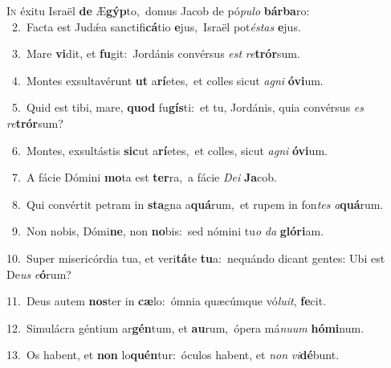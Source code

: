 \lettrine{\initial\textcolor{\initialcolor}{I}}{n} éxitu Israël \textbf{de} Æ\-\textbf{gýp}\-to,~\star domus Jacob de pó\-\textit{pu}\-\textit{lo} \textbf{bár}\-\textbf{ba}ro:\\
{\numbfont\textcolor{\numbcolor}{~2.}}~Facta est Judǽa sanctifi\-\textbf{cá}\-tio \textbf{e}\-jus,~\star Israël pot\-\textit{és}\-\textit{tas} \textbf{e}\-jus.\par
{\numbfont\textcolor{\numbcolor}{~3.}}~Mare \textbf{vi}\-dit, et \textbf{fu}\-git:~\star Jordánis convérsus \textit{est} \textit{re}\-\textbf{trór}sum.\par
{\numbfont\textcolor{\numbcolor}{~4.}}~Montes exsultavérunt \textbf{ut} a\-\textbf{rí}\-etes,~\star et colles sicut \textit{a}\-\textit{gni} \textbf{ó}\-\textbf{vi}um.\par
{\numbfont\textcolor{\numbcolor}{~5.}}~Quid est tibi, mare, \textbf{quod} fu\-\textbf{gís}\-ti:~\star et tu, Jordánis, quia convérsus \textit{es} \textit{re}\-\textbf{trór}sum?\par
{\numbfont\textcolor{\numbcolor}{~6.}}~Montes, exsultástis \textbf{sic}\-ut a\-\textbf{rí}\-etes,~\star et colles, sicut \textit{a}\-\textit{gni} \textbf{ó}\-\textbf{vi}um.\par
{\numbfont\textcolor{\numbcolor}{~7.}}~A fácie Dómini \textbf{mo}\-ta est \textbf{ter}\-ra,~\star a fácie \textit{De}\-\textit{i} \textbf{Ja}\-cob.\par
{\numbfont\textcolor{\numbcolor}{~8.}}~Qui convértit petram in \textbf{sta}\-gna a\-\textbf{quá}\-rum,~\star et rupem in fon\textit{tes} \textit{a}\-\textbf{quá}rum.\par
{\numbfont\textcolor{\numbcolor}{~9.}}~Non nobis, Dómi\-\textbf{ne}\-, non \textbf{no}\-bis:~\star sed nómini tu\textit{o} \textit{da} \textbf{gló}\-\textbf{ri}am.\par
{\numbfont\textcolor{\numbcolor}{10.}}~Super misericórdia tua, et veri\-\textbf{tá}\-te \textbf{tu}\-a:~\star nequándo dicant gentes: Ubi est De\textit{us} \textit{e}\-\textbf{ó}rum?\par
{\numbfont\textcolor{\numbcolor}{11.}}~Deus autem \textbf{nos}\-ter in \textbf{cæ}\-lo:~\star ómnia quæcúmque vó\-\textit{lu}\-\textit{it}, \textbf{fe}\-cit.\par
{\numbfont\textcolor{\numbcolor}{12.}}~Simulácra géntium ar\-\textbf{gén}\-tum, et \textbf{au}\-rum,~\star ópera má\-\textit{nu}\-\textit{um} \textbf{hó}\-\textbf{mi}num.\par
{\numbfont\textcolor{\numbcolor}{13.}}~Os habent, et \textbf{non} lo\-\textbf{quén}\-tur:~\star óculos habent, et \textit{non} \textit{vi}\-\textbf{dé}bunt.\par
